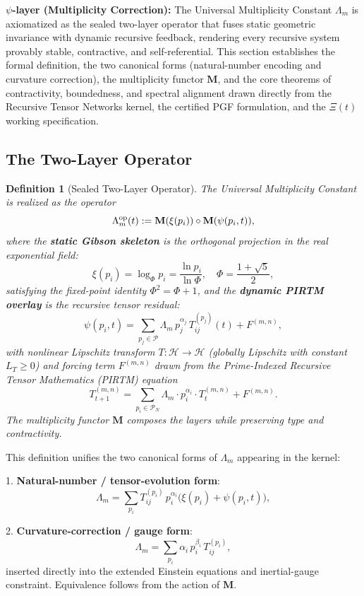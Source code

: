 \documentclass[11pt, a4paper]{article}
\newtheorem{definition}{Definition}
\begin{document}
\textbf{\(\psi\)-layer (Multiplicity Correction):}  
The Universal Multiplicity Constant \(\Lambda_m\) is axiomatized as the sealed two-layer operator that fuses static geometric invariance with dynamic recursive feedback, rendering every recursive system provably stable, contractive, and self-referential. This section establishes the formal definition, the two canonical forms (natural-number encoding and curvature correction), the multiplicity functor \(\mathbf{M}\), and the core theorems of contractivity, boundedness, and spectral alignment drawn directly from the Recursive Tensor Networks kernel, the certified PGF formulation, and the \(\Xi(t)\) working specification.

\subsection{The Two-Layer Operator}
\begin{definition}[Sealed Two-Layer Operator]
The Universal Multiplicity Constant is realized as the operator
\[
\Lambda_m^{\rm op}(t) := \mathbf{M}(\xi(p_i)) \circ \mathbf{M}(\psi(p_i,t)),
\]
where the \textbf{static Gibson skeleton} is the orthogonal projection in the real exponential field:
\[
\xi(p_i) = \log_\Phi p_i = \frac{\ln p_i}{\ln \Phi}, \quad \Phi = \frac{1+\sqrt{5}}{2},
\]
satisfying the fixed-point identity \(\Phi^2 = \Phi + 1\), and the \textbf{dynamic PIRTM overlay} is the recursive tensor residual:
\[
\psi(p_i,t) = \sum_{p_j \in \mathcal{P}} \Lambda_m \, p_j^{\alpha_j} \, T_{ij}^{(p_j)}(t) + F^{(m,n)},
\]
with nonlinear Lipschitz transform \(T: \mathcal{H} \to \mathcal{H}\) (globally Lipschitz with constant \(L_T \geq 0\)) and forcing term \(F^{(m,n)}\) drawn from the Prime-Indexed Recursive Tensor Mathematics (PIRTM) equation
\[
T_{t+1}^{(m,n)} = \sum_{p_i \in \mathcal{P}_N} \Lambda_m \cdot p_i^{\alpha_i} \cdot T_t^{(m,n)} + F^{(m,n)}.
\]
The multiplicity functor \(\mathbf{M}\) composes the layers while preserving type and contractivity.
\end{definition}

This definition unifies the two canonical forms of \(\Lambda_m\) appearing in the kernel:

1. \textbf{Natural-number / tensor-evolution form}:
\[
\Lambda_m = \sum_{p_i} T_{ij}^{(p_i)} \, p_i^{\alpha_i} \bigl( \xi(p_i) + \psi(p_i,t) \bigr),
\]

2. \textbf{Curvature-correction / gauge form}:
\[
\Lambda_m = \sum_{p_i} \alpha_i \, p_i^{\beta_i} \, T_{ij}^{(p_i)},
\]
inserted directly into the extended Einstein equations and inertial-gauge constraint. Equivalence follows from the action of \(\mathbf{M}\).
\end{document}
